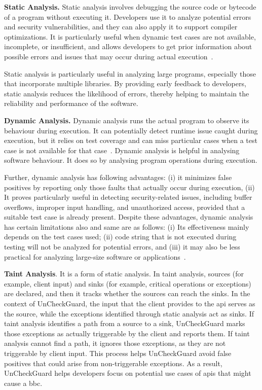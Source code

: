 \textbf{Static Analysis.} Static analysis involves debugging the source code or bytecode
of a program without executing it. Developers use it to analyze potential errors and
security vulnerabilities, and they can also apply it to support compiler optimizations.
It is particularly useful when dynamic test cases are not available,
incomplete, or insufficient, and allows developers to get prior information about possible
errors and issues that may occur during actual execution~\cite{Rahaman2023}.

Static analysis is particularly useful in analyzing large programs, especially those that
incorporate multiple libraries. By providing early feedback to developers,
static analysis reduces the likelihood of errors, thereby helping to maintain the reliability
and performance of the software.

\textbf{Dynamic Analysis.} Dynamic analysis runs the actual program to observe its
behaviour during execution. It can potentially detect runtime issue caught
during execution, but it relies on test coverage and can miss particular cases when a test
case is not available for that case~\cite{Kuliamin2024}. Dynamic analysis is helpful in analysing software
behaviour. It does so by analysing program operations during execution.

Further, dynamic analysis has following advantages: (i) it minimizes false positives by reporting only those faults that actually
occur during execution, (ii) It proves particularly useful in detecting security-related issues,
including buffer overflows, improper input handling, and unauthorized access, provided that a
suitable test case is already present. Despite these advantages, dynamic analysis has certain limitations
also and same are as follows: (i) Its effectiveness mainly depends on the test cases used;
(ii) code string that is not executed during testing will not be analyzed for potential
errors, and (iii) it may also be less practical for analyzing large-size software or
applications~\cite{Somi2024}.

\textbf{Taint Analysis}. It is a form of static analysis. In taint analysis, sources (for example, client input) and sinks (for example, critical operations or exceptions) are declared, and then it tracks whether the sources can reach the sinks. In the context of UnCheckGuard, the input that the client provides to the \gls{api} serves as the source, while the exceptions identified through static analysis act as sinks.  If taint analysis identifies a path from a source to a sink, UnCheckGuard marks those exceptions as actually triggerable by the client and reports them.  If taint analysis cannot find a path, it ignores those exceptions, as they are not triggerable by client input.  This process helps UnCheckGuard avoid false positives that could arise from non-triggerable exceptions.  As a result, UnCheckGuard helps developers focus on potential use cases of \gls{api}s that might cause a \gls{bbc}.

